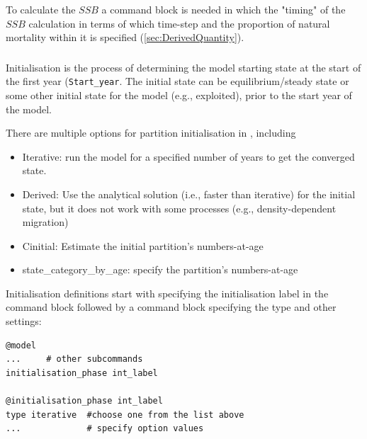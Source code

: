 To calculate the $SSB$ a  command block is needed in which the "timing" of the $SSB$ calculation in terms of which time-step and the proportion of natural mortality within it is specified (\ref{sec:DerivedQuantity}).

\subsubsection{}\label{sec:Initialisation}

Initialisation is the process of determining the model starting state at the start of the first year (\texttt{Start\_year}. The initial state can be equilibrium/steady state or some other initial state for the model (e.g., exploited), prior to the start year of the model.

There are multiple options for partition initialisation in \CNAME, including

\begin{itemize}
	\item Iterative: run the model for a specified number of years to get the converged state.
	\item Derived: Use the analytical solution (i.e., faster than iterative) for the initial state, but it does not work with some processes (e.g., density-dependent migration)
	\ifAgeBased
	\item Cinitial: Estimate the initial partition's numbers-at-age
	\item state\_category\_by\_age: specify the partition's numbers-at-age
	\else
    \fi
\end{itemize}

Initialisation definitions start with specifying the initialisation label in the  command block followed by a  command block specifying the type and other settings:

{\small{\begin{verbatim}
@model
...     # other subcommands
initialisation_phase int_label

@initialisation_phase int_label
type iterative  #choose one from the list above
...             # specify option values

\end{verbatim}}}

